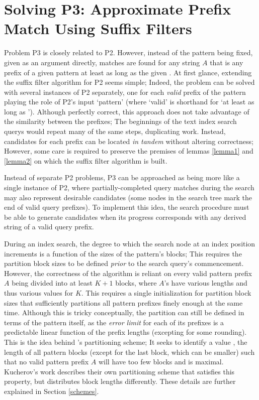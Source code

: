 \section{Solving P3: Approximate Prefix Match Using Suffix Filters}
\label{P3_suff}

Problem P3 is closely related to P2. However, instead of the \gls{pattern} being fixed, given as an argument directly, matches are found for any string $A$ that is any prefix of a given \gls{pattern} at least as long as the given . At first glance, extending the \gls{suffix filter} algorithm for P2 seems simple; Indeed, the problem can be solved with several instances of P2 separately, one for each \textit{valid} prefix of the pattern playing the role of P2's input `pattern' (where `valid' is shorthand for `at least as long as '). Although perfectly correct, this approach does not take advantage of the similarity between the prefixes; The beginnings of the \gls{text index} search \glspl{query} would repeat many of the same steps, duplicating work. Instead, \glspl{candidate} for each prefix can be located \textit{in tandem} without altering correctness; However, some care is required to preserve the premises of lemmas \ref{lemma1} and \ref{lemma2} on which the suffix filter algorithm is built.


 
Instead of separate P2 problems, P3 can be approached as being more like a single instance of P2, where partially-completed query matches during the search may also represent desirable candidates (some nodes in the search tree mark the end of valid query prefixes). To implement this idea, the search procedure must be able to generate candidates when its progress corresponds with any \gls{derived string} of a valid query prefix.

During an index search, the degree to which the search node at an index position increments  is a function of the sizes of the pattern's blocks; This requires the partition block sizes to be defined \textit{prior} to the search query's commencement. However, the correctness of the algorithm is reliant on every valid pattern prefix $A$ being divided into at least $K+1$ blocks, where $A$'s have various lengths and thus various values for $K$. This requires a single initialization for partition block sizes that sufficiently partitions all pattern prefixes finely enough at the same time. Although this is tricky conceptually, the partition can still be defined in terms of the pattern itself, as the \textit{error limit} for each of its prefixes is a predictable linear function of the prefix lengths (excepting for some rounding). This is the idea behind \vali{}'s \gls{partitioning scheme}; It seeks to identify a value , the length of all pattern blocks (except for the last block, which can be smaller) such that no valid pattern prefix $A$ will have too few blocks and  is maximal. Kucherov's work describes their own partitioning scheme that satisfies this property, but distributes block lengths differently. These details are further explained in Section \ref{schemes}.


